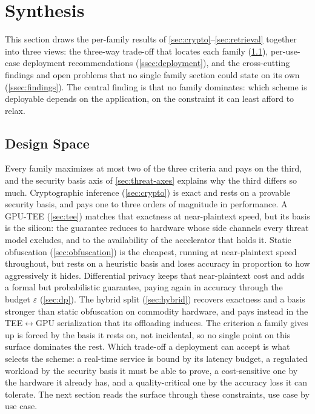 \section{Synthesis}
\label{sec:synthesis}

This section draws the per-family results of \cref{sec:crypto}--\cref{sec:retrieval} together
into three views: the three-way trade-off that locates each family
(\cref{ssec:design-space}), per-use-case deployment recommendations (\cref{ssec:deployment}),
and the cross-cutting findings and open problems that no single family section could state on
its own (\cref{ssec:findings}). The central finding is that no family dominates:
which scheme is deployable depends on the application, on the constraint it can least afford to relax.

\subsection{Design Space}
\label{ssec:design-space}

Every family maximizes at most two of the three criteria and pays on the
third, and the security basis axis of \cref{sec:threat-axes} explains why the third differs so
much. Cryptographic inference
(\cref{sec:crypto}) is exact and rests on a provable security basis, and pays one to three
orders of magnitude in performance. A GPU-TEE (\cref{sec:tee}) matches that exactness at
near-plaintext speed, but its basis is the silicon: the guarantee reduces to hardware whose side
channels every threat model excludes, and to the availability of the accelerator that holds it.
Static obfuscation (\cref{sec:obfuscation}) is the cheapest, running at near-plaintext speed throughout, but
rests on a heuristic basis and loses accuracy in proportion to how aggressively it hides. Differential privacy keeps
that near-plaintext cost and adds a formal but probabilistic guarantee, paying again in accuracy
through the budget $\varepsilon$ (\cref{sec:dp}). The hybrid split (\cref{sec:hybrid}) recovers
exactness and a basis stronger than static obfuscation on commodity hardware, and pays
instead in the TEE$\leftrightarrow$GPU serialization that its offloading induces. The criterion a
family gives up is forced by the basis it rests on, not incidental, so no single point on this
surface dominates the rest. Which trade-off a deployment can accept is what selects the scheme: a
real-time service is bound by its latency budget, a regulated workload by the security basis it
must be able to prove, a cost-sensitive one by the hardware it already has, and a
quality-critical one by the accuracy loss it can tolerate. The next section reads the surface through
these constraints, use case by use case.

